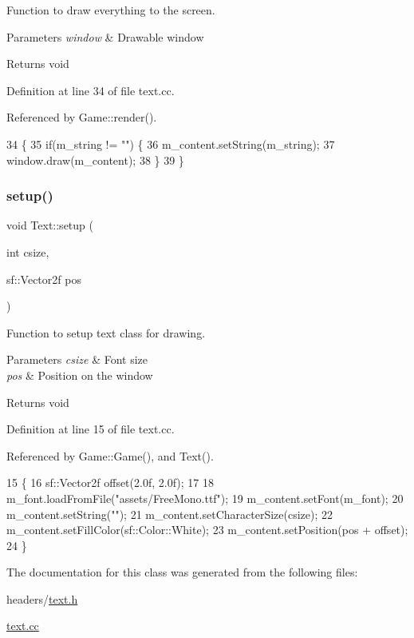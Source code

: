 Function to draw everything to the screen. 


\begin{DoxyParams}{Parameters}
{\em window} & Drawable window \\
\hline
\end{DoxyParams}
\begin{DoxyReturn}{Returns}
void 
\end{DoxyReturn}


Definition at line 34 of file text.\+cc.



Referenced by Game\+::render().


\begin{DoxyCode}
34                                       \{
35     \textcolor{keywordflow}{if}(m\_string != \textcolor{stringliteral}{""}) \{
36         m\_content.setString(m\_string);
37         window.draw(m\_content);
38     \}
39 \}
\end{DoxyCode}
\mbox{\label{class_text_afde89d05e0de0f17092b8c56e6ac77df}} 
\subsubsection{\texorpdfstring{setup()}{setup()}}
{\footnotesize\ttfamily void Text\+::setup (\begin{DoxyParamCaption}\item[{int}]{csize,  }\item[{sf\+::\+Vector2f}]{pos }\end{DoxyParamCaption})}



Function to setup text class for drawing. 


\begin{DoxyParams}{Parameters}
{\em csize} & Font size \\
\hline
{\em pos} & Position on the window \\
\hline
\end{DoxyParams}
\begin{DoxyReturn}{Returns}
void 
\end{DoxyReturn}


Definition at line 15 of file text.\+cc.



Referenced by Game\+::\+Game(), and Text().


\begin{DoxyCode}
15                                           \{   
16     sf::Vector2f offset(2.0f, 2.0f);
17 
18     m\_font.loadFromFile(\textcolor{stringliteral}{"assets/FreeMono.ttf"});
19     m\_content.setFont(m\_font);
20     m\_content.setString(\textcolor{stringliteral}{""});
21     m\_content.setCharacterSize(csize);
22     m\_content.setFillColor(sf::Color::White);
23     m\_content.setPosition(pos + offset);
24 \}
\end{DoxyCode}


The documentation for this class was generated from the following files\+:\begin{DoxyCompactItemize}
\item 
headers/\hyperlink{text_8h}{text.\+h}\item 
\hyperlink{text_8cc}{text.\+cc}\end{DoxyCompactItemize}
